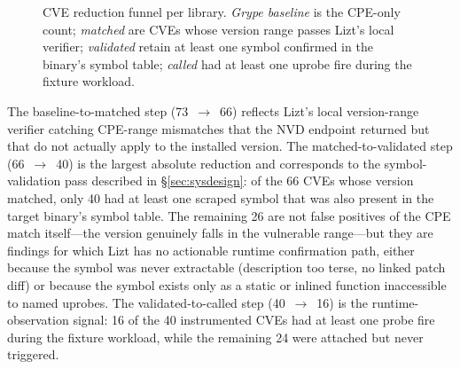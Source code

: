 \documentclass[conference]{IEEEtran}
\begin{document}
\begin{figure}[t]
  \centering
  \caption{CVE reduction funnel per library. \emph{Grype baseline} is the CPE-only count; \emph{matched} are CVEs whose version range passes Lizt's local verifier; \emph{validated} retain at least one symbol confirmed in the binary's symbol table;
    \emph{called} had at least one uprobe fire during the fixture
    workload.}
  \label{fig:cve-funnel}
\end{figure}

The baseline-to-matched step (73~$\to$~66) reflects Lizt's local version-range verifier catching CPE-range mismatches that the NVD endpoint returned but that do not actually apply to the installed version.
The matched-to-validated step (66~$\to$~40) is the largest absolute reduction and corresponds to the symbol-validation pass described in \S\ref{sec:sysdesign}: of the 66 CVEs whose version matched, only 40 had at least one scraped symbol that was also present in the target binary's symbol table.
The remaining 26 are not false positives of the CPE match itself---the version genuinely falls in the vulnerable range---but they are findings for which Lizt has no actionable runtime confirmation path, either because the symbol was never extractable (description too terse, no linked patch diff) or because the symbol exists only as a static or inlined function inaccessible to named uprobes.
The validated-to-called step (40~$\to$~16) is the runtime-observation signal: 16 of the 40 instrumented CVEs had at least one probe fire during the fixture workload, while the remaining 24 were attached but never triggered.
\end{document}

